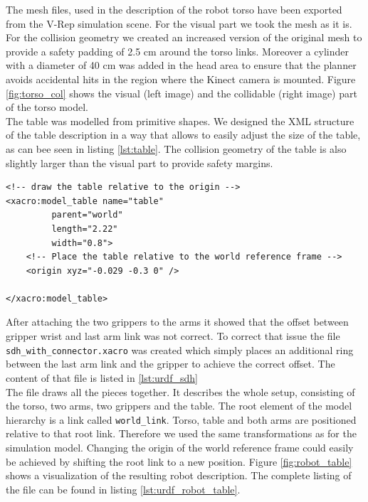 The mesh files, used in the description of the robot torso have been exported from the V-Rep simulation scene. For the visual part we took the mesh as it is. For the collision geometry we created an increased version of the original mesh to provide a safety padding of 2.5 cm around the torso links. Moreover a cylinder with a diameter of 40 cm was added in the head area to ensure that the planner avoids accidental hits in the region where the Kinect camera is mounted. Figure \ref{fig:torso_col} shows the visual (left image) and the collidable (right image) part of the torso model. \\

The table was modelled from primitive shapes. We designed the XML structure of the table description in a way that allows to easily adjust the size of the table, as can bee seen in listing \ref{lst:table}. The collision geometry of the table is also slightly larger than the visual part to provide safety margins. \\

\lstset{language=XML,style=customxml}
\begin{minipage}{\linewidth}
\begin{lstlisting}[caption={XML snippet, inserting the table model into the URDF}, label=lst:table]
<!-- draw the table relative to the origin -->
<xacro:model_table name="table" 
	     parent="world"
	     length="2.22"
	     width="0.8">
	<!-- Place the table relative to the world reference frame -->
	<origin xyz="-0.029 -0.3 0" />
    
</xacro:model_table>
\end{lstlisting}
\end{minipage}

After attaching the two grippers to the arms it showed that the offset between gripper wrist and last arm link was not correct. To correct that issue the file \texttt{sdh\_with\_connector.xacro} was created which simply places an additional ring between the last arm link and the gripper to achieve the correct offset. The content of that file is listed in \ref{lst:urdf_sdh} \\

The file  draws all the pieces together. It describes the whole setup, consisting of the torso, two arms, two grippers and the table. The root element of the model hierarchy is a link called \texttt{world\_link}. Torso, table and both arms are positioned relative to that root link. Therefore we used the same transformations as for the simulation model. Changing the origin of the world reference frame could easily be achieved by shifting the root link to a new position. Figure \ref{fig:robot_table} shows a visualization of the resulting robot description. The complete listing of the  file can be found in listing \ref{lst:urdf_robot_table}.

